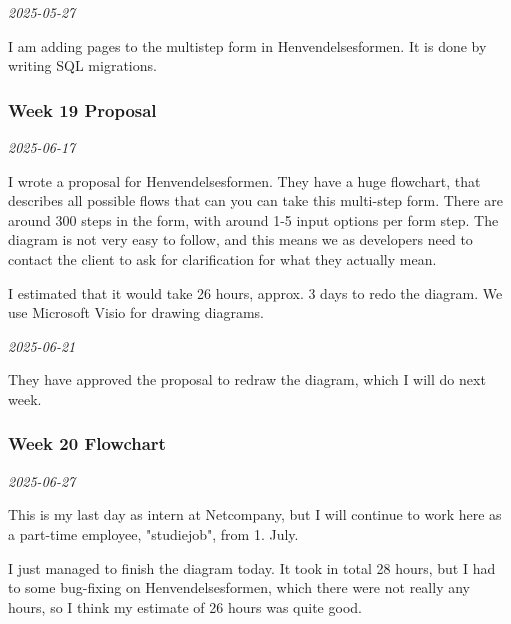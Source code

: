 \documentclass[../main.tex]{subfiles}
\begin{document}
\noindent \textit{2025-05-27}

I am adding pages to the multistep form in Henvendelsesformen. It is done by writing SQL migrations. 
\subsubsection{Week 19 Proposal}

\noindent \textit{2025-06-17}

I wrote a proposal for Henvendelsesformen. They have a huge flowchart, that describes all possible flows that can you can take this multi-step form. There are around 300 steps in the form, with around 1-5 input options per form step. The diagram is not very easy to follow, and this means we as developers need to contact the client to ask for clarification for what they actually mean. 

I estimated that it would take 26 hours, approx. 3 days to redo the diagram. We use Microsoft Visio for drawing diagrams.
\medskip

\noindent \textit{2025-06-21}

They have approved the proposal to redraw the diagram, which I will do next week.

\subsubsection{Week 20 Flowchart}

\noindent \textit{2025-06-27}

This is my last day as intern at Netcompany, but I will continue to work here as a part-time employee, "studiejob", from 1. July. 

I just managed to finish the diagram today. It took in total 28 hours, but I had to some bug-fixing on Henvendelsesformen, which there were not really any hours, so I think my estimate of 26 hours was quite good. 
\end{document}
